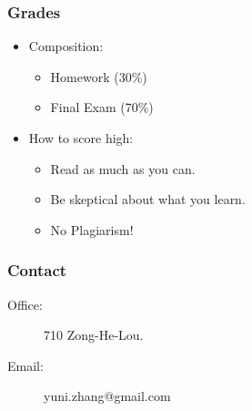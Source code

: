 \begin{frame}\frametitle{Grades}
\begin{itemize}
\item Composition:
\begin{itemize}
\item Homework (30\%)
\item Final Exam (70\%)
\end{itemize}
\item How to score high:
\begin{itemize}
\item Read as much as you can.
\item Be skeptical about what you learn.
\item \alert{No Plagiarism!}
\end{itemize}
\end{itemize}
\end{frame}
\begin{frame}\frametitle{Contact}
\begin{description} 
\item[Office:] 710 Zong-He-Lou.
\item[Email:] yuni.zhang@gmail.com 
\end{description}
\end{frame}

